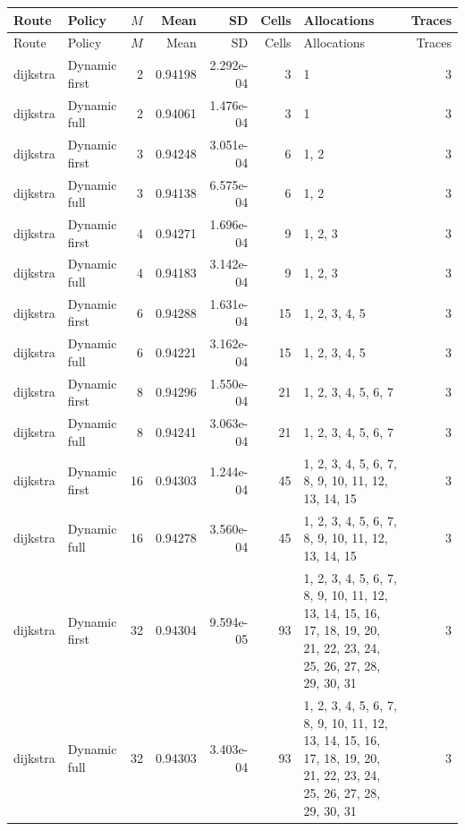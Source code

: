 \documentclass[10pt,a4paper]{article}
\begin{document}
\tiny\setlength{\tabcolsep}{2pt}\begin{longtable}{@{}p{23mm}p{29mm}rrrrp{36mm}r@{}}
\toprule Route & Policy & $M$ & Mean & SD & Cells & Allocations & Traces \\ \midrule\endfirsthead
\toprule Route & Policy & $M$ & Mean & SD & Cells & Allocations & Traces \\ \midrule\endhead
\bottomrule\endfoot
dijkstra & Dynamic first & 2 & 0.94198 & 2.292e-04 & 3 & 1 & 3 \\
dijkstra & Dynamic full & 2 & 0.94061 & 1.476e-04 & 3 & 1 & 3 \\
dijkstra & Dynamic first & 3 & 0.94248 & 3.051e-04 & 6 & 1, 2 & 3 \\
dijkstra & Dynamic full & 3 & 0.94138 & 6.575e-04 & 6 & 1, 2 & 3 \\
dijkstra & Dynamic first & 4 & 0.94271 & 1.696e-04 & 9 & 1, 2, 3 & 3 \\
dijkstra & Dynamic full & 4 & 0.94183 & 3.142e-04 & 9 & 1, 2, 3 & 3 \\
dijkstra & Dynamic first & 6 & 0.94288 & 1.631e-04 & 15 & 1, 2, 3, 4, 5 & 3 \\
dijkstra & Dynamic full & 6 & 0.94221 & 3.162e-04 & 15 & 1, 2, 3, 4, 5 & 3 \\
dijkstra & Dynamic first & 8 & 0.94296 & 1.550e-04 & 21 & 1, 2, 3, 4, 5, 6, 7 & 3 \\
dijkstra & Dynamic full & 8 & 0.94241 & 3.063e-04 & 21 & 1, 2, 3, 4, 5, 6, 7 & 3 \\
dijkstra & Dynamic first & 16 & 0.94303 & 1.244e-04 & 45 & 1, 2, 3, 4, 5, 6, 7, 8, 9, 10, 11, 12, 13, 14, 15 & 3 \\
dijkstra & Dynamic full & 16 & 0.94278 & 3.560e-04 & 45 & 1, 2, 3, 4, 5, 6, 7, 8, 9, 10, 11, 12, 13, 14, 15 & 3 \\
dijkstra & Dynamic first & 32 & 0.94304 & 9.594e-05 & 93 & 1, 2, 3, 4, 5, 6, 7, 8, 9, 10, 11, 12, 13, 14, 15, 16, 17, 18, 19, 20, 21, 22, 23, 24, 25, 26, 27, 28, 29, 30, 31 & 3 \\
dijkstra & Dynamic full & 32 & 0.94303 & 3.403e-04 & 93 & 1, 2, 3, 4, 5, 6, 7, 8, 9, 10, 11, 12, 13, 14, 15, 16, 17, 18, 19, 20, 21, 22, 23, 24, 25, 26, 27, 28, 29, 30, 31 & 3 \\
\end{longtable}\normalsize\setlength{\tabcolsep}{6pt}
\clearpage
\end{document}
